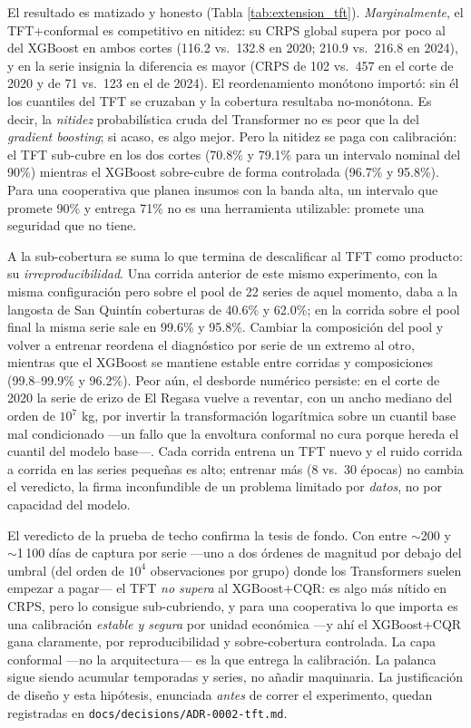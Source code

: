 El resultado es matizado y honesto (Tabla \ref{tab:extension_tft}). \emph{Marginalmente}, el TFT+conformal es competitivo en nitidez: su CRPS global supera por poco al del XGBoost en ambos cortes (116.2 vs.\ 132.8 en 2020; 210.9 vs.\ 216.8 en 2024), y en la serie insignia la diferencia es mayor (CRPS de 102 vs.\ 457 en el corte de 2020 y de 71 vs.\ 123 en el de 2024). El reordenamiento monótono importó: sin él los cuantiles del TFT se cruzaban y la cobertura resultaba no-monótona. Es decir, la \emph{nitidez} probabilística cruda del Transformer no es peor que la del \emph{gradient boosting}; si acaso, es algo mejor. Pero la nitidez se paga con calibración: el TFT sub-cubre en los dos cortes (70.8\% y 79.1\% para un intervalo nominal del 90\%) mientras el XGBoost sobre-cubre de forma controlada (96.7\% y 95.8\%). Para una cooperativa que planea insumos con la banda alta, un intervalo que promete 90\% y entrega 71\% no es una herramienta utilizable: promete una seguridad que no tiene.

A la sub-cobertura se suma lo que termina de descalificar al TFT como producto: su \emph{irreproducibilidad}. Una corrida anterior de este mismo experimento, con la misma configuración pero sobre el pool de 22 series de aquel momento, daba a la langosta de San Quintín coberturas de 40.6\% y 62.0\%; en la corrida sobre el pool final la misma serie sale en 99.6\% y 95.8\%. Cambiar la composición del pool y volver a entrenar reordena el diagnóstico por serie de un extremo al otro, mientras que el XGBoost se mantiene estable entre corridas y composiciones (99.8--99.9\% y 96.2\%). Peor aún, el desborde numérico persiste: en el corte de 2020 la serie de erizo de El Regasa vuelve a reventar, con un ancho mediano del orden de $10^{7}$ kg, por invertir la transformación logarítmica sobre un cuantil base mal condicionado ---un fallo que la envoltura conformal no cura porque hereda el cuantil del modelo base---. Cada corrida entrena un TFT nuevo y el ruido corrida a corrida en las series pequeñas es alto; entrenar más (8 vs.\ 30 épocas) no cambia el veredicto, la firma inconfundible de un problema limitado por \emph{datos}, no por capacidad del modelo.

El veredicto de la prueba de techo confirma la tesis de fondo. Con entre $\sim$200 y $\sim$1\,100 días de captura por serie ---uno a dos órdenes de magnitud por debajo del umbral (del orden de $10^{4}$ observaciones por grupo) donde los Transformers suelen empezar a pagar--- el TFT \emph{no supera} al XGBoost+CQR: es algo más nítido en CRPS, pero lo consigue sub-cubriendo, y para una cooperativa lo que importa es una calibración \emph{estable y segura} por unidad económica ---y ahí el XGBoost+CQR gana claramente, por reproducibilidad y sobre-cobertura controlada. La capa conformal ---no la arquitectura--- es la que entrega la calibración. La palanca sigue siendo acumular temporadas y series, no añadir maquinaria. La justificación de diseño y esta hipótesis, enunciada \emph{antes} de correr el experimento, quedan registradas en \texttt{docs/decisions/ADR-0002-tft.md}.

